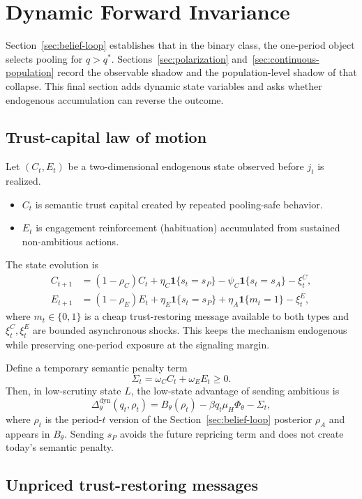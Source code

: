 \section{Dynamic Forward Invariance}
\label{sec:dynamic-invariance}

Section~\ref{sec:belief-loop} establishes that in the binary class, the one-period object selects pooling for $q>q^*$. Sections~\ref{sec:polarization} and~\ref{sec:continuous-population} record the observable shadow and the population-level shadow of that collapse. This final section adds dynamic state variables and asks whether endogenous accumulation can reverse the outcome.

\subsection{Trust-capital law of motion}

Let $(C_t,E_t)$ be a two-dimensional endogenous state observed before $j_t$ is realized.
\begin{itemize}
\item $C_t$ is semantic trust capital created by repeated pooling-safe behavior.
\item $E_t$ is engagement reinforcement (habituation) accumulated from sustained non-ambitious actions.
\end{itemize}
The state evolution is
\[
\begin{aligned}
C_{t+1}&=(1-\rho_C)C_t + \eta_C\mathbf 1\{s_t=s_P\} - \psi_C\mathbf 1\{s_t=s_A\} -\xi_t^C,\\
E_{t+1}&=(1-\rho_E)E_t + \eta_E\mathbf 1\{s_t=s_P\}+\eta_A\mathbf 1\{m_t=1\} -\xi_t^E,
\end{aligned}
\]
where $m_t\in\{0,1\}$ is a cheap trust-restoring message available to both types and $\xi_t^C,\xi_t^E$ are bounded asynchronous shocks. This keeps the mechanism endogenous while preserving one-period exposure at the signaling margin.

Define a temporary semantic penalty term
\[
\Sigma_t=\omega_C C_t+\omega_E E_t\ge 0.
\]
Then, in low-scrutiny state $L$, the low-state advantage of sending ambitious is
\[
\Delta_\theta^{\text{dyn}}(q_t,\rho_t)=B_\theta(\rho_t)-\beta q_t\mu_H\Phi_\theta-\Sigma_t,
\]
where $\rho_t$ is the period-$t$ version of the Section~\ref{sec:belief-loop} posterior $\rho_A$ and appears in $B_\theta$. Sending $s_P$ avoids the future repricing term and does not create today's semantic penalty.

\subsection{Unpriced trust-restoring messages}

